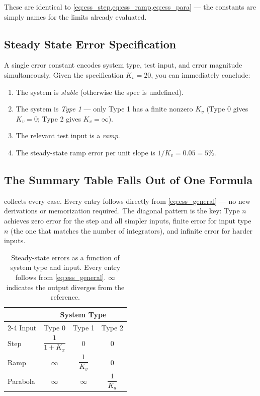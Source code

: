 \documentclass[../../book.tex]{subfiles}
\begin{document}
These are identical to \cref{eq:ess_step,eq:ess_ramp,eq:ess_para} ---
the constants are simply names for the limits already evaluated.

\subsection{Steady State Error Specification}

A single error constant encodes system type, test input, and error magnitude
simultaneously.  Given the specification $K_v = 20$, you can immediately
conclude:
\begin{enumerate}
  \item The system is \emph{stable} (otherwise the spec is undefined).
  \item The system is \emph{Type 1} --- only Type 1 has a finite nonzero $K_v$
    (Type 0 gives $K_v = 0$; Type 2 gives $K_v = \infty$).
  \item The relevant test input is a \emph{ramp}.
  \item The steady-state ramp error per unit slope is $1/K_v = 0.05 = 5\%$.
\end{enumerate}

\subsection{The Summary Table Falls Out of One Formula}

 collects every case.  Every entry follows directly from
\cref{eq:ess_general} --- no new derivations or memorization required.  The
diagonal pattern is the key: Type $n$ achieves zero error for the step and all
simpler inputs, finite error for input type $n$ (the one that matches the
number of integrators), and infinite error for harder inputs.

\begin{table}[htbp]
\centering
\caption{Steady-state errors as a function of system type and input.  Every
  entry follows from \cref{eq:ess_general}.  $\infty$ indicates the output
  diverges from the reference.}
\label{tab:sse_summary}
\begin{tabular}{lccc}
\toprule
 & \multicolumn{3}{c}{System Type} \\
\cmidrule(lr){2-4}
Input    & Type 0              & Type 1              & Type 2 \\
\midrule
Step     & $\dfrac{1}{1+K_x}$ & $0$                 & $0$    \\[10pt]
Ramp     & $\infty$            & $\dfrac{1}{K_v}$   & $0$    \\[10pt]
Parabola & $\infty$            & $\infty$            & $\dfrac{1}{K_a}$ \\[10pt]
\bottomrule
\end{tabular}
\end{table}
\end{document}

